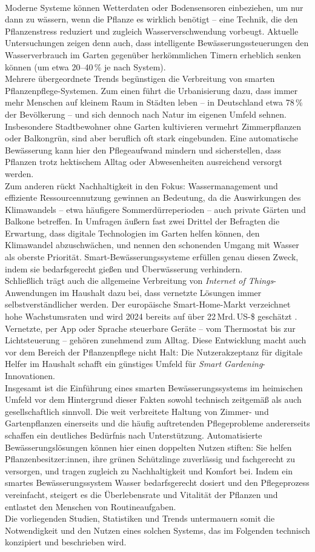 \\
Moderne Systeme können Wetterdaten oder Bodensensoren einbeziehen, um nur dann zu wässern, wenn die Pflanze es wirklich benötigt – eine Technik, die den Pflanzenstress reduziert und zugleich Wasserverschwendung vorbeugt. Aktuelle Untersuchungen zeigen denn auch, dass intelligente Bewässerungssteuerungen den Wasserverbrauch im Garten gegenüber herkömmlichen Timern erheblich senken können (um etwa 20–40\,\% je nach System). \autocite{water_savings}
\\
Mehrere übergeordnete Trends begünstigen die Verbreitung von smarten Pflanzenpflege-Systemen. Zum einen führt die Urbanisierung dazu, dass immer mehr Menschen auf kleinem Raum in Städten leben – in Deutschland etwa 78\,\% der Bevölkerung \autocite{urbanisierung_de} – und sich dennoch nach Natur im eigenen Umfeld sehnen.  Insbesondere Stadtbewohner ohne Garten kultivieren vermehrt Zimmerpflanzen oder Balkongrün, sind aber beruflich oft stark eingebunden. Eine automatische Bewässerung kann hier den Pflegeaufwand mindern und sicherstellen, dass Pflanzen trotz hektischem Alltag oder Abwesenheiten ausreichend versorgt werden. 
\\
Zum anderen rückt Nachhaltigkeit in den Fokus: Wassermanagement und effiziente Ressourcennutzung gewinnen an Bedeutung, da die Auswirkungen des Klimawandels – etwa häufigere Sommerdürreperioden – auch private Gärten und Balkone betreffen. In Umfragen äußern fast zwei Drittel der Befragten die Erwartung, dass digitale Technologien im Garten helfen können, den Klimawandel abzuschwächen, und nennen den schonenden Umgang mit Wasser als oberste Priorität. \autocite{gardena} Smart-Bewässerungssysteme erfüllen genau diesen Zweck, indem sie bedarfsgerecht gießen und Überwässerung verhindern. 
\\
Schließlich trägt auch die allgemeine Verbreitung von \textit{Internet of Things}-Anwendungen im Haushalt dazu bei, dass vernetzte Lösungen immer selbstverständlicher werden. Der europäische Smart-Home-Markt verzeichnet hohe Wachstumsraten und wird 2024 bereits auf über 22\,Mrd.\,US-\$ geschätzt \autocite{iot_trend}. Vernetzte, per App oder Sprache steuerbare Geräte – vom Thermostat bis zur Lichtsteuerung – gehören zunehmend zum Alltag. Diese Entwicklung macht auch vor dem Bereich der Pflanzenpflege nicht Halt: Die Nutzerakzeptanz für digitale Helfer im Haushalt schafft ein günstiges Umfeld für \textit{Smart Gardening}-Innovationen.
\\
Insgesamt ist die Einführung eines smarten Bewässerungssystems im heimischen Umfeld vor dem Hintergrund dieser Fakten sowohl technisch zeitgemäß als auch gesellschaftlich sinnvoll. Die weit verbreitete Haltung von Zimmer- und Gartenpflanzen einerseits und die häufig auftretenden Pflegeprobleme andererseits schaffen ein deutliches Bedürfnis nach Unterstützung. Automatisierte Bewässerungslösungen können hier einen doppelten Nutzen stiften: Sie helfen Pflanzenbesitzer:innen, ihre grünen Schützlinge zuverlässig und fachgerecht zu versorgen, und tragen zugleich zu Nachhaltigkeit und Komfort bei. Indem ein smartes Bewässerungssystem Wasser bedarfsgerecht dosiert und den Pflegeprozess vereinfacht, steigert es die Überlebensrate und Vitalität der Pflanzen und entlastet den Menschen von Routineaufgaben. 
\\
Die vorliegenden Studien, Statistiken und Trends untermauern somit die Notwendigkeit und den Nutzen eines solchen Systems, das im Folgenden technisch konzipiert und beschrieben wird.
